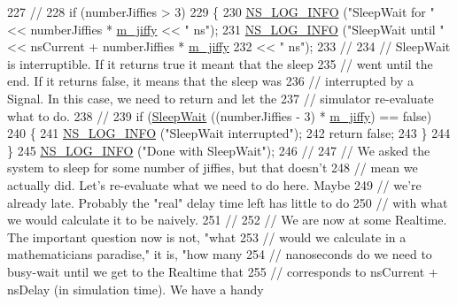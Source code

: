 \begin{DoxyCode}
227 \textcolor{comment}{//}
228   \textcolor{keywordflow}{if} (numberJiffies > 3)
229     \{
230       \hyperlink{group__logging_gafbd73ee2cf9f26b319f49086d8e860fb}{NS\_LOG\_INFO} (\textcolor{stringliteral}{"SleepWait for "} << numberJiffies * \hyperlink{classns3_1_1WallClockSynchronizer_a2bf669a1ab0a9238dc67ad692b2dfc61}{m\_jiffy} << \textcolor{stringliteral}{" ns"});
231       \hyperlink{group__logging_gafbd73ee2cf9f26b319f49086d8e860fb}{NS\_LOG\_INFO} (\textcolor{stringliteral}{"SleepWait until "} << nsCurrent + numberJiffies * 
      \hyperlink{classns3_1_1WallClockSynchronizer_a2bf669a1ab0a9238dc67ad692b2dfc61}{m\_jiffy} 
232                                       << \textcolor{stringliteral}{" ns"});
233 \textcolor{comment}{//}
234 \textcolor{comment}{// SleepWait is interruptible.  If it returns true it meant that the sleep}
235 \textcolor{comment}{// went until the end.  If it returns false, it means that the sleep was }
236 \textcolor{comment}{// interrupted by a Signal.  In this case, we need to return and let the }
237 \textcolor{comment}{// simulator re-evaluate what to do.}
238 \textcolor{comment}{//}
239       \textcolor{keywordflow}{if} (\hyperlink{classns3_1_1WallClockSynchronizer_a1adbfec497fb2868e685759e60ca1b4d}{SleepWait} ((numberJiffies - 3) * \hyperlink{classns3_1_1WallClockSynchronizer_a2bf669a1ab0a9238dc67ad692b2dfc61}{m\_jiffy}) == \textcolor{keyword}{false})
240         \{
241           \hyperlink{group__logging_gafbd73ee2cf9f26b319f49086d8e860fb}{NS\_LOG\_INFO} (\textcolor{stringliteral}{"SleepWait interrupted"});
242           \textcolor{keywordflow}{return} \textcolor{keyword}{false};
243         \}
244     \}
245   \hyperlink{group__logging_gafbd73ee2cf9f26b319f49086d8e860fb}{NS\_LOG\_INFO} (\textcolor{stringliteral}{"Done with SleepWait"});
246 \textcolor{comment}{//}
247 \textcolor{comment}{// We asked the system to sleep for some number of jiffies, but that doesn't }
248 \textcolor{comment}{// mean we actually did.  Let's re-evaluate what we need to do here.  Maybe }
249 \textcolor{comment}{// we're already late.  Probably the "real" delay time left has little to do}
250 \textcolor{comment}{// with what we would calculate it to be naively.}
251 \textcolor{comment}{//}
252 \textcolor{comment}{// We are now at some Realtime.  The important question now is not, "what}
253 \textcolor{comment}{// would we calculate in a mathematicians paradise," it is, "how many}
254 \textcolor{comment}{// nanoseconds do we need to busy-wait until we get to the Realtime that}
255 \textcolor{comment}{// corresponds to nsCurrent + nsDelay (in simulation time).  We have a handy}

\end{DoxyCode}
